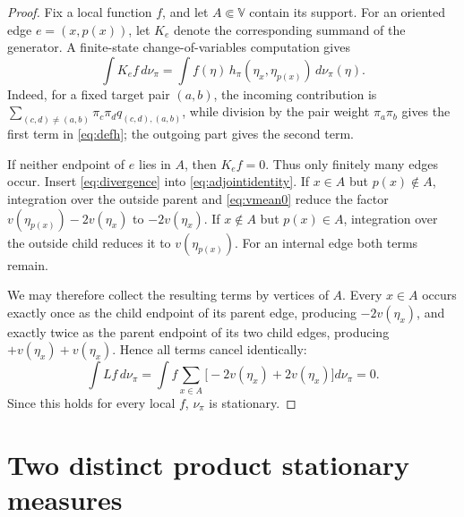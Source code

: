 \documentclass[11pt]{article}
\newcommand{\V}{\mathbb V}
\begin{document}
\begin{proof}
Fix a local function $f$, and let $A\Subset\V$ contain its support.  For an
oriented edge $e=(x,p(x))$, let $K_e$ denote the corresponding summand of the
generator.  A finite-state change-of-variables computation gives
\begin{equation}
 \int K_e f\,d\nu_\pi
 =\int f(\eta)\,h_\pi(\eta_x,\eta_{p(x)})\,d\nu_\pi(\eta).
 \label{eq:adjointidentity}
\end{equation}
Indeed, for a fixed target pair $(a,b)$, the incoming contribution is
$\sum_{(c,d)\ne(a,b)}\pi_c\pi_d q_{(c,d),(a,b)}$, while division by the
pair weight $\pi_a\pi_b$ gives the first term in \eqref{eq:defh}; the outgoing
part gives the second term.

If neither endpoint of $e$ lies in $A$, then $K_e f=0$.  Thus only finitely many
edges occur.  Insert \eqref{eq:divergence} into
\eqref{eq:adjointidentity}.  If $x\in A$ but $p(x)\notin A$, integration over
the outside parent and \eqref{eq:vmean0} reduce the factor
$v(\eta_{p(x)})-2v(\eta_x)$ to $-2v(\eta_x)$.  If
$x\notin A$ but $p(x)\in A$, integration over the outside child reduces it to
$v(\eta_{p(x)})$.  For an internal edge both terms remain.

We may therefore collect the resulting terms by vertices of $A$.  Every
$x\in A$ occurs exactly once as the child endpoint of its parent edge, producing
$-2v(\eta_x)$, and exactly twice as the parent endpoint of its two child edges,
producing $+v(\eta_x)+v(\eta_x)$.  Hence all terms cancel identically:
\[
 \int Lf\,d\nu_\pi
 =\int f\sum_{x\in A}\bigl[-2v(\eta_x)+2v(\eta_x)\bigr]d\nu_\pi=0.
\]
Since this holds for every local $f$, $\nu_\pi$ is stationary.
\end{proof}

\section{Two distinct product stationary measures}
\end{document}
